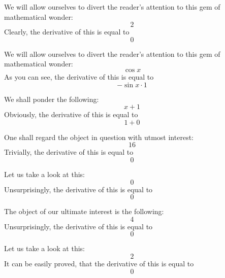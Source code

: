 \documentclass{article}
\begin{document}
We will allow ourselves to divert the reader's attention to this gem of mathematical wonder:
\begin{equation}
2 
\end{equation}
Clearly, the derivative of this is equal to
\begin{equation}
0 
\end{equation}

We will allow ourselves to divert the reader's attention to this gem of mathematical wonder:
\begin{equation}
\cos x 
\end{equation}
As you can see, the derivative of this is equal to
\begin{equation}
-\sin x \cdot 1 
\end{equation}

We shall ponder the following:
\begin{equation}
x + 1 
\end{equation}
Obviously, the derivative of this is equal to
\begin{equation}
1 + 0 
\end{equation}

One shall regard the object in question with utmost interest:
\begin{equation}
16 
\end{equation}
Trivially, the derivative of this is equal to
\begin{equation}
0 
\end{equation}

Let us take a look at this:
\begin{equation}
0 
\end{equation}
Unsurprisingly, the derivative of this is equal to
\begin{equation}
0 
\end{equation}

The object of our ultimate interest is the following:
\begin{equation}
4 
\end{equation}
Unsurprisingly, the derivative of this is equal to
\begin{equation}
0 
\end{equation}

Let us take a look at this:
\begin{equation}
2 
\end{equation}
It can be easily proved, that the derivative of this is equal to
\begin{equation}
0 
\end{equation}
\end{document}
